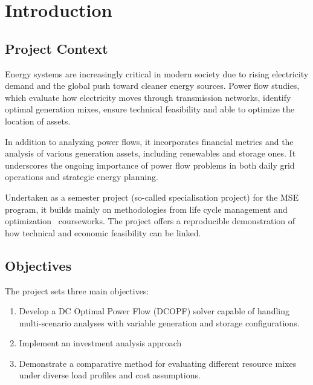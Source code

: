 \newpage
\section{Introduction}

\subsection{Project Context}
Energy systems are increasingly critical in modern society due to rising electricity demand and the global push toward 
cleaner energy sources. Power flow studies, which evaluate how electricity moves through transmission networks, identify
optimal generation mixes, ensure technical feasibility and able to optimize the location of assets. 


In addition to analyzing power flows, it incorporates financial metrics and the analysis of various generation assets, 
including renewables and storage ones. It underscores the ongoing importance of power flow problems in both daily grid 
operations and strategic energy planning.

Undertaken as a semester project (so-called specialisation project) for the MSE program, it builds mainly on methodologies 
from life cycle management and optimization~\cite{optimization_notes} courseworks. The project offers a reproducible 
demonstration of how technical and economic feasibility can be linked.


\subsection{Objectives}
The project sets three main objectives:
\begin{enumerate}
    \item Develop a DC Optimal Power Flow (DCOPF) solver capable of handling multi-scenario analyses with variable 
    generation and storage configurations.
    \item Implement an investment analysis approach
    \item Demonstrate a comparative method for evaluating different resource mixes under diverse load profiles and cost 
    assumptions.
\end{enumerate}

